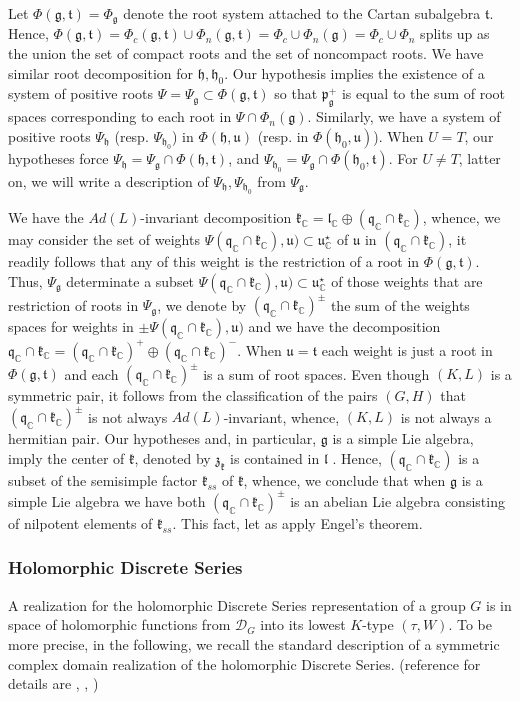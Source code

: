\documentclass[12pt]{amsart}
\theoremstyle{definition}
\theoremstyle{remark}
\newcommand{\g}{\mathfrak{g}}
\newcommand{\h}{\mathfrak{h}}
\renewcommand{\k}{{\mathfrak k}}
\renewcommand{\l}{\mathfrak l}
\newcommand{\p}{\mathfrak p}
\newcommand{\q}{\mathfrak q}
\newcommand{\z}{\mathfrak z}
\renewcommand{\t}{{\mathfrak t}}
\renewcommand{\u}{{\mathfrak u}}
\newcommand{\C}{{\mathbb C}}
\numberwithin{equation}{section}
\begin{document}
Let $\Phi(\mathfrak g,\mathfrak t)=\Phi_\g $  denote the root system attached to the Cartan subalgebra $\mathfrak t.$ Hence, $\Phi(\mathfrak g,\mathfrak t) =\Phi_c(\mathfrak g, \mathfrak t) \cup \Phi_n (\mathfrak g, \mathfrak t) =\Phi_c \cup \Phi_n(\g)=  \Phi_c \cup \Phi_n$ splits up as the union the set of compact roots and the set of noncompact roots. We have similar root decomposition for $\h, \h_0$. Our hypothesis implies the existence of a system of positive roots $\Psi=\Psi_\g  \subset \Phi(\g,\t) $ so that $\p_\g^+$ is equal to the sum of root spaces corresponding to each root in $\Psi \cap \Phi_n(\g)$. Similarly, we have a system of positive roots $\Psi_\h$ (resp. $\Psi_{\h_0}$) in $\Phi(\h,\u)$ (resp. in $\Phi(\h_0, \u)$). When $U=T$, our hypotheses force $\Psi_\h =\Psi_\g \cap \Phi(\h,\t)$, and $\Psi_{\h_0} =\Psi_\g \cap \Phi(\h_0,\t)$. For $U\not= T$, latter on, we will write a description of $\Psi_\h, \Psi_{\h_0}$ from $\Psi_\g$.


We have the $Ad(L)$-invariant decomposition $\k_\C  =\l_\C \oplus  (\q_\C \cap \k_\C)$, whence, we may consider the set of weights $\Psi(\q_\C \cap \k_\C),\u) \subset \u_\C^\star $   of $\u$ in $(\q_\C \cap \k_\C)$, it readily follows that any of this weight  is the restriction of a root in $\Phi(\g,\t)$. Thus, $\Psi_\g$ determinate a subset $\Psi(\q_\C \cap \k_\C),\u) \subset \u_\C^\star $  of those weights that are restriction of roots in $\Psi_\g$, we denote by $(\q_\C \cap \k_\C)^\pm$ the sum of the weights spaces for weights in  $\pm \Psi(\q_\C \cap \k_\C),\u)$    and we have the decomposition $\q_\C \cap \k_\C= (\q_\C \cap \k_\C)^+\oplus (\q_\C \cap \k_\C)^-$. When $\u=\t$ each weight is just a root in $\Phi(\g, \t)$ and each $(\q_\C \cap \k_\C)^\pm$ is a sum of root spaces.  Even though $(K,L)$ is a symmetric pair,   it   follows from the classification of the pairs $(G,H)$ \cite{Kob9}\cite{KOadv} that $(\q_\C \cap \k_\C)^\pm$  is  not always $Ad(L)$-invariant, whence,  $(K,L)$ is not always  a hermitian pair. Our hypotheses and, in particular,  $\g$ is a simple Lie algebra, imply the center of $\k$, denoted by $\z_\k$ is contained in $\l$ \cite[Section 3.6]{Kob9}. Hence,  $(\q_\C \cap \k_\C)$ is a subset of the semisimple factor $\k_{ss}$ of $\k$, whence,  we conclude that when $\g$ is a simple Lie algebra we have both $(\q_\C \cap \k_\C)^\pm$ is an abelian  Lie algebra consisting of nilpotent elements of $\k_{ss}$. This fact,   let as apply Engel's theorem.

\subsubsection{Holomorphic Discrete Series}\label{sub:holds} A realization for the holomorphic Discrete Series representation of a group $G$ is in space of holomorphic functions from $\mathcal D_G$ into its lowest $K$-type $(\tau, W)$. To be more precise, in the following,    we recall the standard description
of a symmetric complex domain realization of the holomorphic Discrete Series.   (reference for details are \cite{FOO}, \cite{JV}, \cite[XII.5]{Neeb})
\end{document}
